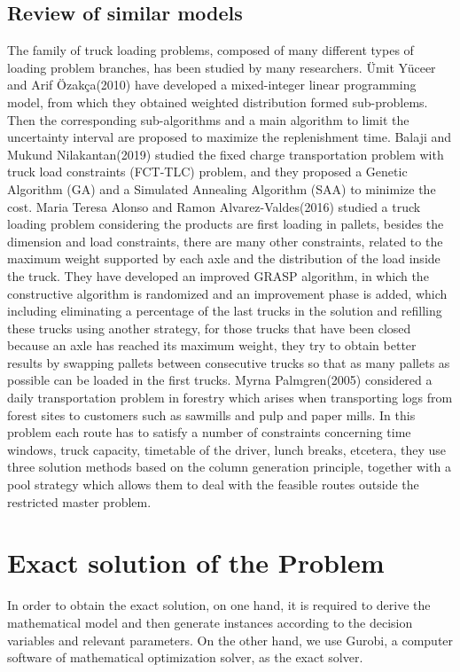 \documentclass{article}
\begin{document}
\subsection{Review of similar models} 
The family of truck loading problems, composed of many different types of loading problem branches, has been studied by many researchers. Ümit Yüceer and Arif Özakça(2010) have developed a mixed-integer linear programming model, from which they obtained weighted distribution formed sub-problems. Then the corresponding sub-algorithms and a main algorithm to limit the uncertainty interval are proposed to maximize the replenishment time. Balaji and Mukund Nilakantan(2019) studied the fixed charge transportation problem with truck load constraints (FCT-TLC) problem, and they proposed a Genetic Algorithm (GA) and a Simulated Annealing Algorithm (SAA) to minimize the cost. Maria Teresa Alonso and Ramon Alvarez-Valdes(2016) studied a truck loading problem considering the products are first loading in pallets, besides the dimension and load constraints, there are many other constraints, related to the maximum weight supported by each axle and the distribution of the load inside the truck. They have developed an improved GRASP algorithm, in which the constructive algorithm is randomized and an improvement phase is added, which including eliminating a percentage of the last trucks in the solution and refilling these trucks using another strategy, for those trucks that have been closed because an axle has reached its maximum weight, they try to obtain better results by swapping pallets between consecutive trucks so that as many pallets as possible can be loaded in the first trucks. Myrna Palmgren(2005) considered a daily transportation problem in forestry which arises when transporting logs from forest sites to customers such as sawmills and pulp and paper mills. In this problem each route has to satisfy a number of constraints concerning time windows, truck capacity, timetable of the driver, lunch breaks, etcetera, they use three solution methods based on the column generation principle, together with a pool strategy which allows them to deal with the feasible routes outside the restricted master problem.


\section{Exact solution of the Problem}
\label{sec:exact}
In order to obtain the exact solution, on one hand, it is required to derive the mathematical model and then generate instances according to the decision variables and relevant parameters. On the other hand, we use Gurobi, a computer software of mathematical optimization solver, as the exact solver.
\end{document}
